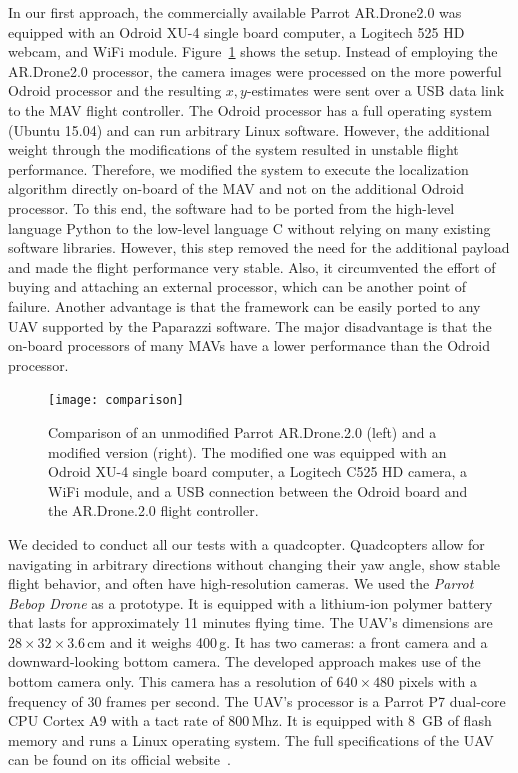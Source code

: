 \documentclass[11pt]{report}
\begin{document}
In our first approach, the commercially available Parrot AR.Drone2.0
was equipped with an Odroid XU-4 single board computer, a Logitech 525
HD webcam, and WiFi module. Figure~\ref{fig:comparison} shows the
setup. Instead of employing the AR.Drone2.0 processor, the camera
images were processed on the more powerful Odroid processor and the
resulting $x,y$-estimates were sent over a USB data link to the MAV
flight controller. The Odroid processor has a full operating system
(Ubuntu 15.04) and can run arbitrary Linux software.  However, the
additional weight through the modifications of the system resulted in
unstable flight performance. Therefore, we modified the system to
execute the localization algorithm directly on-board of the MAV and not
on the additional Odroid processor. To this end, the software had to
be ported from the high-level language Python to the low-level
language C without relying on many existing software libraries.
However, this step removed the need for the additional payload and
made the flight performance very stable. Also, it circumvented the
effort of buying and attaching an external processor, which can be
another point of failure. Another advantage is that the framework can
be easily ported to any UAV supported by the Paparazzi software. The
major disadvantage is that the on-board processors of many MAVs have a
lower performance than the Odroid processor.

\begin{figure}[h!]
\begin{center}
\texttt{[image: comparison]}
\caption{{\label{fig:comparison}
Comparison of an unmodified Parrot AR.Drone.2.0 (left) and a
    modified version (right). The modified one was equipped with an
    Odroid XU-4 single board computer, a Logitech C525 HD camera, a
    WiFi module, and a USB connection between the Odroid board and the
    AR.Drone.2.0 flight controller.%
}}
\end{center}
\end{figure}

We decided to conduct all our tests with a quadcopter. Quadcopters
allow for navigating in arbitrary directions without changing their
yaw angle, show stable flight behavior, and often have high-resolution
cameras. We used the \emph{Parrot Bebop Drone} as a prototype. It is
equipped with a lithium-ion polymer battery that lasts for
approximately 11 minutes flying time. The UAV's dimensions are
$28 \times 32 \times 3.6$\,cm and it weighs 400\,g. It has two
cameras: a front camera and a downward-looking bottom camera. The
developed approach makes use of the bottom camera only. This camera
has a resolution of $640 \times 480$ pixels with a frequency of 30
frames per second. The UAV's processor is a Parrot P7 dual-core CPU
Cortex A9 with a tact rate of 800\,Mhz. It is equipped with 8~GB of
flash memory and runs a Linux operating system. The full
specifications of the UAV can be found on its official
website~\cite{bebop}.
\end{document}
